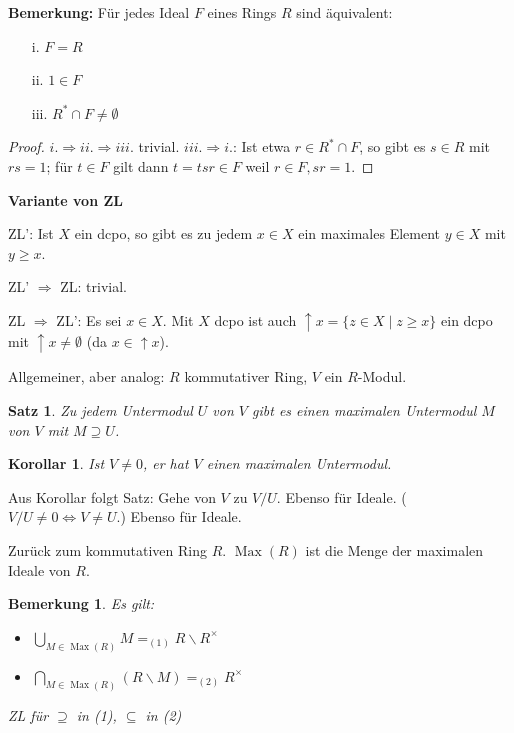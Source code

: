 \documentclass[headsepline=true,DIV=11]{scrartcl}
\newtheorem*{theorem}{Satz}
\newtheorem*{corollary}{Korollar}
\newtheorem*{remark}{Bemerkung}
\theoremstyle{definition}
\newenvironment{gelaber}{}{}
\newcommand{\Max}{\operatorname{Max}}
\begin{document}
\begin{gelaber}
  {\bf Bemerkung:} Für jedes Ideal $F$ eines Rings $R$ sind äquivalent:
  \begin{itemize}
    \item[i.] $F=R$
    \item[ii.] $1\in F$
    \item[iii.] $R^*\cap F\neq\emptyset$
  \end{itemize}
  \begin{proof}
    $i.\Rightarrow ii.\Rightarrow iii.$ trivial. $iii.\Rightarrow i.$: Ist etwa $r\in R^*\cap F$, so gibt es $s\in R$ mit $rs=1$; für $t\in F$ gilt
    dann $t=tsr\in F$ weil $r\in F, sr=1$.
  \end{proof}
\end{gelaber}

\begin{gelaber}
  {\bf Variante von ZL}

  ZL': Ist $X$ ein dcpo, so gibt es zu jedem $x\in X$ ein maximales Element $y\in X$ mit $y\ge x$.

  ZL' $\Rightarrow$ ZL: trivial.

  ZL $\Rightarrow$ ZL': Es sei $x\in X$. Mit $X$ dcpo ist auch $\uparrow x = \{z\in X\mid z\ge x\}$ ein dcpo mit $\uparrow x \neq\emptyset$ (da
  $x\in\uparrow x$).
\end{gelaber}


Allgemeiner, aber analog: $R$ kommutativer Ring, $V$ ein $R$-Modul.

\begin{theorem}
  Zu jedem Untermodul $U$ von $V$ gibt es einen maximalen Untermodul $M$ von $V$ mit $M\supseteq U$.
\end{theorem}

\begin{corollary}
  Ist $V\neq 0$, er hat $V$ einen maximalen Untermodul.
\end{corollary}

Aus Korollar folgt Satz: Gehe von $V$ zu $V/U$. Ebenso für Ideale. ($V/U\neq 0\Leftrightarrow V\neq U$.) Ebenso für Ideale.

Zurück zum kommutativen Ring $R$. $\Max(R)$ ist die Menge der maximalen Ideale von $R$.

\begin{remark}
  Es gilt:
  \begin{itemize}
    \item $\bigcup\limits_{M\in\Max(R)} M =_{(1)} R\backslash R^\times$
    \item $\bigcap\limits_{M\in\Max(R)} (R\backslash M) =_{(2)} R^\times$
  \end{itemize}
  ZL für $\supseteq$ in (1), $\subseteq$ in (2)
\end{remark}
\end{document}
